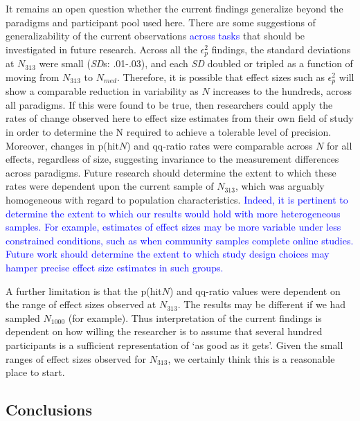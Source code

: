 \documentclass[
  man]{apa6}
\begin{document}
It remains an open question whether the current findings generalize beyond the paradigms and participant pool used here. There are some suggestions of generalizability of the current observations \textcolor{blue}{across tasks} that should be investigated in future research. Across all the \(\epsilon_{p}^2\) findings, the standard deviations at \(N_{313}\) were small (\emph{SD}s: .01-.03), and each \emph{SD} doubled or tripled as a function of moving from \(N_{313}\) to \(N_{med}\). Therefore, it is possible that effect sizes such as \(\epsilon_{p}^2\) will show a comparable reduction in variability as \(N\) increases to the hundreds, across all paradigms. If this were found to be true, then researchers could apply the rates of change observed here to effect size estimates from their own field of study in order to determine the N required to achieve a tolerable level of precision. Moreover, changes in p(hit\textbar{}\(N\)) and qq-ratio rates were comparable across \(N\) for all effects, regardless of size, suggesting invariance to the measurement differences across paradigms. Future research should determine the extent to which these rates were dependent upon the current sample of \(N_{313}\), which was arguably homogeneous with regard to population characteristics. \textcolor{blue}{Indeed, it is pertinent to determine the extent to which our results would hold with more heterogeneous samples. For example, estimates of effect sizes may be more variable under less constrained conditions, such as when community samples complete online studies. Future work should determine the extent to which study design choices may hamper precise effect size estimates in such groups.}

A further limitation is that the p(hit\textbar{}\(N\)) and qq-ratio values were dependent on the range of effect sizes observed at \(N_{313}\). The results may be different if we had sampled \(N_{1000}\) (for example). Thus interpretation of the current findings is dependent on how willing the researcher is to assume that several hundred participants is a sufficient representation of `as good as it gets'. Given the small ranges of effect sizes observed for \(N_{313}\), we certainly think this is a reasonable place to start.

\hypertarget{conclusions}{%
\subsection{Conclusions}\label{conclusions}}
\end{document}
